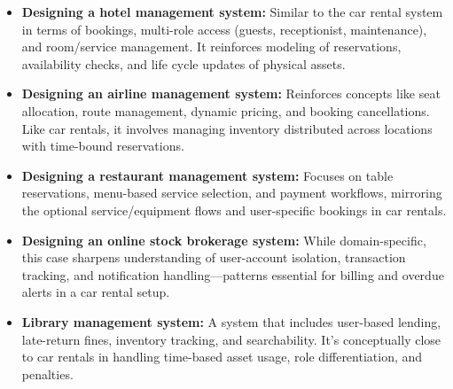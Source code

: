 \begin{itemize}
\item
\protect{}\label{h5OqtPecvX_1Z58idPby0}
\textbf{Designing a hotel management system:} Similar to the car rental system in terms of bookings, multi-role access (guests, receptionist, maintenance), and room/service management. It reinforces modeling of reservations, availability checks, and life cycle updates of physical assets.
\item
\protect{}\label{LjhSKOKJOAqSLUsOEtM95}
\textbf{Designing an airline management system:} Reinforces concepts like seat allocation, route management, dynamic pricing, and booking cancellations. Like car rentals, it involves managing inventory distributed across locations with time-bound reservations.
\item
\protect{}\label{IDpVtVvN2vtA3wT-pL-lE}
\textbf{Designing a restaurant management system:} Focuses on table reservations, menu-based service selection, and payment workflows, mirroring the optional service/equipment flows and user-specific bookings in car rentals.
\item
\protect{}\label{skZKswSNHutsgwBTr0GjK}
\textbf{Designing an online stock brokerage system:} While domain-specific, this case sharpens understanding of user-account isolation, transaction tracking, and notification handling---patterns essential for billing and overdue alerts in a car rental setup.
\item
\protect{}\label{Xh7KpRJbh5-3JDpKyrjZV}
\textbf{Library management system:} A system that includes user-based lending, late-return fines, inventory tracking, and searchability. It's conceptually close to car rentals in handling time-based asset usage, role differentiation, and penalties.
\end{itemize}

